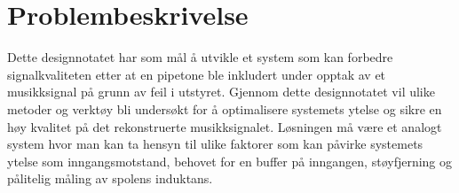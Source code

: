\section{Problembeskrivelse}
\label{problemBeskrivelse}


Dette designnotatet har som mål å utvikle et system som kan forbedre signalkvaliteten etter at en pipetone ble inkludert under opptak av et musikksignal på grunn av feil i utstyret\cite{Problemstillingen}. Gjennom dette designnotatet vil ulike metoder og verktøy bli undersøkt for å optimalisere systemets ytelse og sikre en høy kvalitet på det rekonstruerte musikksignalet. Løsningen må være et analogt system hvor man kan ta hensyn til ulike faktorer som kan påvirke systemets ytelse som inngangsmotstand, behovet for en buffer på inngangen, støyfjerning og pålitelig måling av spolens induktans.
